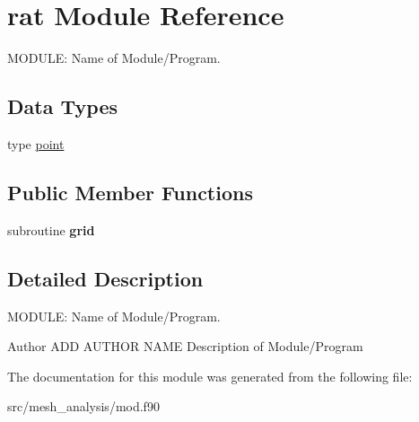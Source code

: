 \hypertarget{classrat}{\section{rat Module Reference}
\label{classrat}
}


M\-O\-D\-U\-L\-E\-: Name of Module/\-Program.  


\subsection*{Data Types}
\begin{DoxyCompactItemize}
\item 
type \hyperlink{structrat_1_1point}{point}
\end{DoxyCompactItemize}
\subsection*{Public Member Functions}
\begin{DoxyCompactItemize}
\item 
\hypertarget{classrat_a6805e21a8cb643fe8b80eddfd2bd0579}{subroutine {\bfseries grid}}\label{classrat_a6805e21a8cb643fe8b80eddfd2bd0579}

\end{DoxyCompactItemize}


\subsection{Detailed Description}
M\-O\-D\-U\-L\-E\-: Name of Module/\-Program. 

\begin{DoxyAuthor}{Author}
A\-D\-D A\-U\-T\-H\-O\-R N\-A\-M\-E Description of Module/\-Program 
\end{DoxyAuthor}


The documentation for this module was generated from the following file\-:\begin{DoxyCompactItemize}
\item 
src/mesh\-\_\-analysis/mod.\-f90\end{DoxyCompactItemize}
